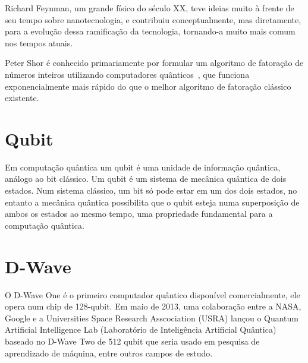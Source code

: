 \documentclass[letterpaper,twocolumn,10pt]{article}
\begin{document}
Richard Feynman, um grande físico do século XX, teve ideias muito à frente de
seu tempo sobre nanotecnologia, e contribuiu conceptualmente, mas diretamente,
para a evolução dessa ramificação da tecnologia, tornando-a muito mais comum
nos tempos atuais.

Peter Shor é conhecido primariamente por formular um algoritmo de fatoração de
números inteiros utilizando computadores quânticos~\cite{Shor}, que funciona
exponencialmente mais rápido do que o melhor algoritmo de fatoração clássico
existente.

\section{Qubit}

Em computação quântica um qubit é uma unidade de informação quântica, análogo
ao bit clássico. Um qubit é um sistema de mecânica quântica de dois estados.
Num sistema clássico, um bit só pode estar em um dos dois estados, no entanto a
mecânica quântica possibilita que o qubit esteja numa superposição de ambos os
estados ao mesmo tempo, uma propriedade fundamental para a computação quântica.

\section{D-Wave}

O D-Wave One é o primeiro computador quântico disponível comercialmente, ele
opera num chip de 128-qubit. Em maio de 2013, uma colaboração entre a NASA,
Google e a Universities Space Research Asscociation (USRA) lançou o Quantum
Artificial Intelligence Lab (Laboratório de Inteligência Artificial Quântica)
baseado no D-Wave Two de 512 qubit que seria usado em pesquisa de aprendizado
de máquina, entre outros campos de estudo.

\footnotesize  
\end{document}

